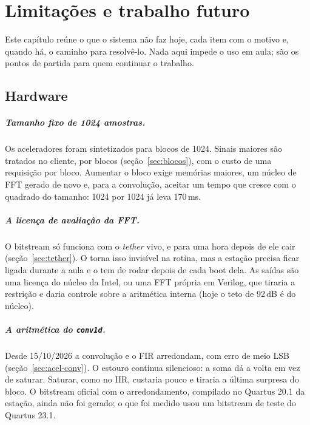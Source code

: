 \chapter{Limitações e trabalho futuro}
\label{cap:limitacoes}

Este capítulo reúne o que o sistema não faz hoje, cada item com o motivo e,
quando há, o caminho para resolvê-lo. Nada aqui impede o uso em aula; são os
pontos de partida para quem continuar o trabalho.

\section{Hardware}

\paragraph{Tamanho fixo de 1024 amostras.} Os aceleradores foram sintetizados
para blocos de 1024. Sinais maiores são tratados no cliente, por blocos
(seção~\ref{sec:blocos}), com o custo de uma requisição por bloco. Aumentar o
bloco exige memórias maiores, um núcleo de FFT gerado de novo e, para a
convolução, aceitar um tempo que cresce com o quadrado do tamanho: 1024 por
1024 já leva 170\,ms.

\paragraph{A licença de avaliação da FFT.} O bitstream só funciona com o
\emph{tether} vivo, e para uma hora depois de ele cair
(seção~\ref{sec:tether}). O  torna isso invisível na rotina,
mas a estação precisa ficar ligada durante a aula e o  tem de
rodar depois de cada boot dela. As saídas são uma licença do núcleo da Intel,
ou uma FFT própria em Verilog, que tiraria a restrição e daria controle sobre a
aritmética interna (hoje o teto de 92\,dB é do núcleo).

\paragraph{A aritmética do \texttt{conv1d}.} Desde 15/10/2026 a convolução e
o FIR arredondam, com erro de meio LSB (seção~\ref{sec:acel-conv}). O estouro
continua silencioso: a soma dá a volta em vez de saturar. Saturar, como no IIR,
custaria pouco e tiraria a última surpresa do bloco. O bitstream oficial com o
arredondamento, compilado no Quartus 20.1 da estação, ainda não foi gerado; o
que foi medido usou um bitstream de teste do Quartus 23.1.

